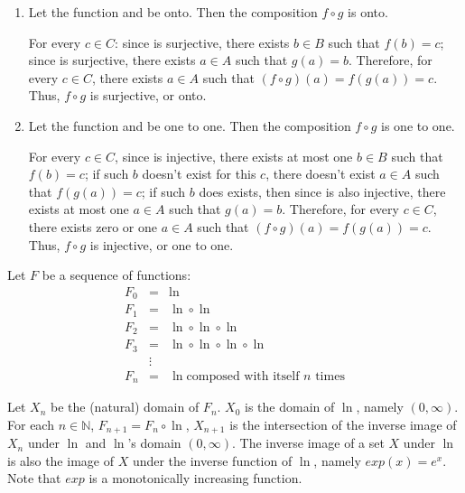 \documentclass{article}
\begin{document}
\begin{enumerate}
\item Let the function  and  be onto. Then the composition $f \circ g$ is onto.

\Proof{} For every $c \in C$: since  is surjective, there exists $b \in B$ such that $f(b) = c$; since  is surjective, there exists $a \in A$ such that $g(a) = b$. Therefore, for every $c \in C$, there exists $a \in A$ such that $(f \circ g)(a) = f(g(a)) = c$. Thus, $f \circ g$ is surjective, or onto. \QED

\item Let the function  and  be one to one. Then the composition $f \circ g$ is one to one.

\Proof{} For every $c \in C$, since  is injective, there exists at most one $b \in B$ such that $f(b) = c$; if such $b$ doesn't exist for this $c$, there doesn't exist $a \in A$ such that $f(g(a)) = c$; if such $b$ does exists, then since  is also injective, there exists at most one $a \in A$ such that $g(a) = b$. Therefore, for every $c \in C$, there exists zero or one $a \in A$ such that $(f \circ g)(a) = f(g(a)) = c$. Thus, $f \circ g$ is injective, or one to one. \QED
\end{enumerate}

Let $F$ be a sequence of functions:
$$\begin{array}{rcl}
F_0 &=& \ln \\
F_1 &=& \ln \circ \ln \\
F_2 &=& \ln \circ \ln \circ \ln \\
F_3 &=& \ln \circ \ln \circ \ln \circ \ln \\
&\vdots& \\
F_n &=& \ln \text{composed with itself $n$ times}
\end{array}$$

Let $X_n$ be the (natural) domain of $F_{n}$. $X_{0}$ is the domain of $\ln$, namely $(0, \infty)$. For each $n \in \mathbb{N}$, $F_{n+1} = F_n \circ \ln$, $X_{n+1}$ is the intersection of the inverse image of $X_n$ under $\ln$ and $\ln$'s domain $(0, \infty)$. The inverse image of a set $X$ under $\ln$ is also the image of $X$ under the inverse function of $\ln$, namely $exp(x) = e^x$. Note that $exp$ is a monotonically increasing function.
\end{document}
